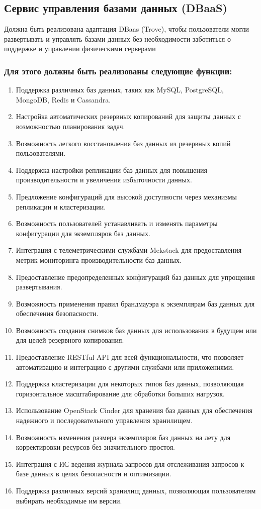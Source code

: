 \documentclass[14pt, a4paper]{extarticle}
\begin{document}
\subsection{Сервис управления базами данных (DBaaS)}

Должна быть реализована адаптация DBaas (Trove), чтобы пользователи могли развертывать и управлять базами данных без необходимости заботиться о поддержке и управлении физическими серверами

\subsubsection*{Для этого должны быть реализованы следующие функции:}

\begin{enumerate}
\item Поддержка различных баз данных, таких как MySQL, PostgreSQL, MongoDB, Redis и Cassandra.
\item Настройка автоматических резервных копирований для защиты данных с возможностью планирования задач.
\item Возможность легкого восстановления баз данных из резервных копий пользователями.
\item Поддержка настройки репликации баз данных для повышения производительности и увеличения избыточности данных.
\item Предложение конфигураций для высокой доступности через механизмы репликации и кластеризации.
\item Возможность пользователей устанавливать и изменять параметры конфигурации для экземпляров баз данных.
\item Интеграция с телеметрическими службами Mekstack для предоставления метрик мониторинга производительности баз данных.
\item Предоставление предопределенных конфигураций баз данных для упрощения развертывания.
\item Возможность применения правил брандмауэра к экземплярам баз данных для обеспечения безопасности.
\item Возможность создания снимков баз данных для использования в будущем или для целей резервного копирования.
\item Предоставление RESTful API для всей функциональности, что позволяет автоматизацию и интеграцию с другими службами или приложениями.
\item Поддержка кластеризации для некоторых типов баз данных, позволяющая горизонтальное масштабирование для обработки больших нагрузок.
\item Использование OpenStack Cinder для хранения баз данных для обеспечения надежного и последовательного управления хранилищем.
\item Возможность изменения размера экземпляров баз данных на лету для корректировки ресурсов без значительного простоя.
\item Интеграция с ИС ведения журнала запросов для отслеживания запросов к базе данных в целях безопасности и оптимизации.
\item Поддержка различных версий хранилищ данных, позволяющая пользователям выбирать необходимые им версии.
\end{enumerate}
\end{document}
